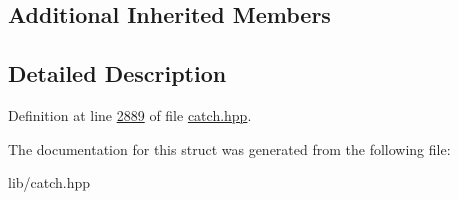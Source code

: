 \subsection*{Additional Inherited Members}


\subsection{Detailed Description}


Definition at line \mbox{\hyperlink{catch_8hpp_source_l02889}{2889}} of file \mbox{\hyperlink{catch_8hpp_source}{catch.\+hpp}}.



The documentation for this struct was generated from the following file\+:\begin{DoxyCompactItemize}
\item 
lib/catch.\+hpp\end{DoxyCompactItemize}

